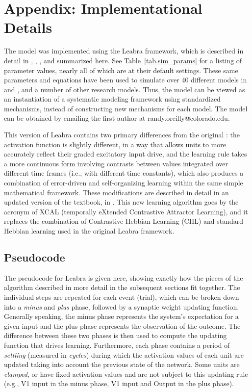 \section{Appendix: Implementational Details}

The model was implemented using the Leabra framework, which is described in detail in , , , and summarized here.  See Table~\ref{tab.sim_params} for a listing of parameter values, nearly all of which are at their default settings.  These same parameters and equations have been used to simulate over 40 different models in  and , and a number of other research models.  Thus, the model can be viewed as an instantiation of a systematic modeling framework using standardized mechanisms, instead of constructing new mechanisms for each model.  The model can be obtained by emailing the first author at randy.oreilly@colorado.edu.

This version of Leabra contains two primary differences from the original \cite{OReillyMunakata00}: the activation function is slightly different, in a way that allows units to more accurately reflect their graded excitatory input drive, and the learning rule takes a more continuous form involving contrasts between values integrated over different time frames (i.e., with different time constants), which also produces a combination of error-driven and self-organizing learning within the same simple mathematical framework.  These modifications are described in detail in an updated version of the  textbook, in .  This new learning algorithm goes by the acronym of XCAL (temporally eXtended Contrastive Attractor Learning), and it replaces the combination of Contrastive Hebbian Learning (CHL) and standard Hebbian learning used in the original Leabra framework.

\subsection{Pseudocode}

The pseudocode for Leabra is given here, showing exactly how the pieces of the algorithm described in more detail in the subsequent sections fit together. The individual steps are repeated for each event (trial), which can be broken down into a {\em minus} and {\em plus} phase, followed by a synaptic weight updating function. Generally speaking, the minus phase represents the system's expectation for a given input and the plus phase represents the observation of the outcome. The difference between these two phases is then used to compute the updating function that drives learning. Furthermore, each phase contains a period of {\em settling} (measured in {\em cycles}) during which the activation values of each unit are updated taking into account the previous state of the network. Some units are {\em clamped}, or have fixed activation values and are not subject to this updating rule (e.g., V1 input in the minus phase, V1 input and Output in the plus phase).


